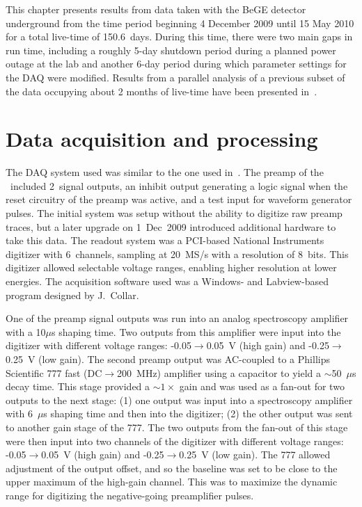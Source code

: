 This chapter presents results from data taken with the BeGE detector underground from the time period beginning 4 December 2009 until 15 May 2010 for a total live-time of 150.6~days.  During this time, there were two main gaps in run time, including a roughly 5-day shutdown period during a planned power outage at the lab and another 6-day period during which parameter settings for the DAQ were modified.  Results from a parallel analysis of a previous subset of the data occupying about 2 months of live-time have been presented in~\cite{Aalseth:2010aa}.

	\section{Data acquisition and processing}
	\label{sec:BeGeDAQProcessing}
	
The DAQ system used was similar to the one used in~\cite{Aalseth:2008aa}.  The preamp of the \bege~included 2~signal outputs, an inhibit output generating a logic signal when the reset circuitry of the preamp was active, and a test input for waveform generator pulses.  The initial system was setup without the ability to digitize raw preamp traces, but a later upgrade on 1~Dec~2009 introduced additional hardware to take this data.  The readout system was a PCI-based National Instruments digitizer with 6~channels, sampling at 20~MS/s with a resolution of 8~bits.  This digitizer allowed selectable voltage ranges, enabling higher resolution at lower energies.  The acquisition software used was a Windows- and Labview-based program designed by J.~Collar.  

One of the preamp signal outputs was run into an analog spectroscopy amplifier with a 10$\mu$s shaping time.  Two outputs from this amplifier were input into the digitizer with different voltage ranges: -0.05$\to$0.05~V (high gain) and -0.25$\to$0.25~V (low gain).  The second preamp output was AC-coupled to a Phillips Scientific 777 fast (DC$\to$200~MHz) amplifier using a capacitor to yield a $\sim$50~$\mu$s decay time.  This stage provided a $\sim1\times$ gain and was used as a fan-out for two outputs to the next stage: (1) one output was input into a spectroscopy amplifier with 6~$\mu$s shaping time and then into the digitizer; (2) the other output was sent to another gain stage of the 777.  The two outputs from the fan-out of this stage were then input into two channels of the digitizer with different voltage ranges: -0.05$\to$0.05~V (high gain) and -0.25$\to$0.25~V (low gain).  The 777 allowed adjustment of the output offset, and so the baseline was set to be close to the upper maximum of the high-gain channel.  This was to maximize the dynamic range for digitizing the negative-going preamplifier pulses.  

